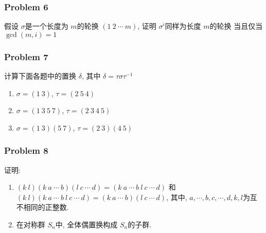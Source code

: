 \documentclass[a4paper,12pt]{ctexart}
\begin{document}
\subsubsection*{Problem 6}
    假设 $ \sigma $是一个长度为 $ m $的轮换 $ (1~2~\cdots~m) $, 证明 $ \sigma^i $同样为长度 $ m $的轮换
    当且仅当 $ \gcd(m,i)=1 $
  \subsubsection*{Problem 7}
  计算下面各题中的置换 $ \delta $, 其中 $ \delta=\tau\sigma\tau^{-1} $
  \begin{enumerate}
    \item $ \sigma=(1~3) $, $ \tau=(2~5~4) $
    \item $ \sigma=(1~3~5~7) $, $ \tau=(2~3~4~5) $
    \item $ \sigma=(1~3)(5~7) $, $ \tau=(2~3)(4~5) $
  \end{enumerate}
\subsubsection*{Problem 8}
    证明: 
    \begin{enumerate}
      \item $ (k~l)(k~a~\cdots ~b)(l~c~\cdots ~d)=(k~a~\cdots ~b~l~c~\cdots ~d) $
      和 $ (k~l)(k~a~\cdots ~b~l~c~\cdots ~d)=(k~a~\cdots ~b)(l~c~\cdots ~d) $, 其中, 
      $ a,\cdots,b,c,\cdots,d,k,l $为互不相同的正整数.
      \item 在对称群 $ S_n $中, 全体偶置换构成 $ S_n $的子群.
    \end{enumerate}
\end{document}
